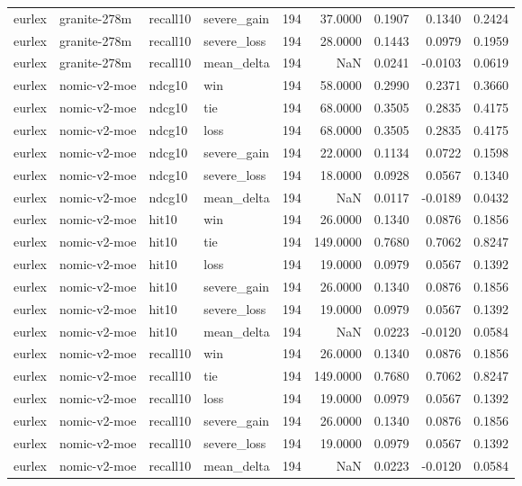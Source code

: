 \begin{tabular}{llllrrrrr}
eurlex & granite-278m & recall10 & severe\_gain & 194 & 37.0000 & 0.1907 & 0.1340 & 0.2424 \\
eurlex & granite-278m & recall10 & severe\_loss & 194 & 28.0000 & 0.1443 & 0.0979 & 0.1959 \\
eurlex & granite-278m & recall10 & mean\_delta & 194 & NaN & 0.0241 & -0.0103 & 0.0619 \\
eurlex & nomic-v2-moe & ndcg10 & win & 194 & 58.0000 & 0.2990 & 0.2371 & 0.3660 \\
eurlex & nomic-v2-moe & ndcg10 & tie & 194 & 68.0000 & 0.3505 & 0.2835 & 0.4175 \\
eurlex & nomic-v2-moe & ndcg10 & loss & 194 & 68.0000 & 0.3505 & 0.2835 & 0.4175 \\
eurlex & nomic-v2-moe & ndcg10 & severe\_gain & 194 & 22.0000 & 0.1134 & 0.0722 & 0.1598 \\
eurlex & nomic-v2-moe & ndcg10 & severe\_loss & 194 & 18.0000 & 0.0928 & 0.0567 & 0.1340 \\
eurlex & nomic-v2-moe & ndcg10 & mean\_delta & 194 & NaN & 0.0117 & -0.0189 & 0.0432 \\
eurlex & nomic-v2-moe & hit10 & win & 194 & 26.0000 & 0.1340 & 0.0876 & 0.1856 \\
eurlex & nomic-v2-moe & hit10 & tie & 194 & 149.0000 & 0.7680 & 0.7062 & 0.8247 \\
eurlex & nomic-v2-moe & hit10 & loss & 194 & 19.0000 & 0.0979 & 0.0567 & 0.1392 \\
eurlex & nomic-v2-moe & hit10 & severe\_gain & 194 & 26.0000 & 0.1340 & 0.0876 & 0.1856 \\
eurlex & nomic-v2-moe & hit10 & severe\_loss & 194 & 19.0000 & 0.0979 & 0.0567 & 0.1392 \\
eurlex & nomic-v2-moe & hit10 & mean\_delta & 194 & NaN & 0.0223 & -0.0120 & 0.0584 \\
eurlex & nomic-v2-moe & recall10 & win & 194 & 26.0000 & 0.1340 & 0.0876 & 0.1856 \\
eurlex & nomic-v2-moe & recall10 & tie & 194 & 149.0000 & 0.7680 & 0.7062 & 0.8247 \\
eurlex & nomic-v2-moe & recall10 & loss & 194 & 19.0000 & 0.0979 & 0.0567 & 0.1392 \\
eurlex & nomic-v2-moe & recall10 & severe\_gain & 194 & 26.0000 & 0.1340 & 0.0876 & 0.1856 \\
eurlex & nomic-v2-moe & recall10 & severe\_loss & 194 & 19.0000 & 0.0979 & 0.0567 & 0.1392 \\
eurlex & nomic-v2-moe & recall10 & mean\_delta & 194 & NaN & 0.0223 & -0.0120 & 0.0584 \\

\end{tabular}

